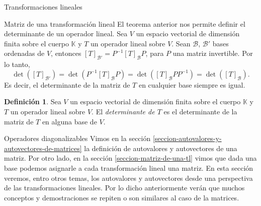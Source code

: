 \documentclass[a4paper,12pt,twoside,spanish,reqno]{amsbook}
\numberwithin{equation}{section}
\theoremstyle{definition}
\newtheorem{definicion}[teorema]{Definici\'on}
\theoremstyle{remark}
\newcommand{\K}{\mathbb K}
\begin{document}
\begin{chapter}{Transformaciones lineales}
\begin{section}{Matriz de una transformación lineal}
        El teorema anterior nos permite definir el determinante de un operador lineal.	Sea $V$ un espacio vectorial de dimensión finita sobre el cuerpo $\K$ y $T$ un operador lineal sobre $V$. Sean  $\mathcal B$, $\mathcal B'$ 
        bases ordenadas de $V$, entonces $[T]_{\mathcal B'} = P^{-1}[T]_{\mathcal B}P$, para $P$ una matriz invertible. Por lo tanto, 
        \begin{equation*}
            \det([T]_{\mathcal B'}) = \det(P^{-1}[T]_{\mathcal B}  P) =  \det([T]_{\mathcal B}  PP^{-1}) =  \det([T]_{\mathcal B}). 
        \end{equation*}
        Es decir,  el determinante de la matriz de $T$ en cualquier base siempre es igual.
        
        \begin{definicion} 
                Sea $V$ un espacio vectorial de dimensión finita sobre el cuerpo $\K$ y $T$ un operador lineal sobre $V$. El \textit{determinante de $T$} es el determinante de la matriz de $T$ en alguna base de $V$.  
        \end{definicion}
        \end{section}
    
    
    
    
    
    
    
        \begin{section}{Operadores diagonalizables}\label{seccion-autovalores-y-autovectores-de-una-tl}
        Vimos en la sección  \ref{seccion-autovalores-y-autovectores-de-matrices} la definición de autovalores y autovectores de una matriz. Por otro lado,  en la sección \ref{seccion-matriz-de-una-tl} vimos que dada una base podemos asignarle a cada transformación lineal una matriz. En  esta sección veremos,  entro otros temas,  los autovalores y autovectores desde una perspectiva de las transformaciones lineales. Por lo dicho anteriormente  verán que muchos conceptos y demostraciones se repiten o son similares al caso de la matrices. 
        

\end{section}
\end{chapter}
\end{document}
